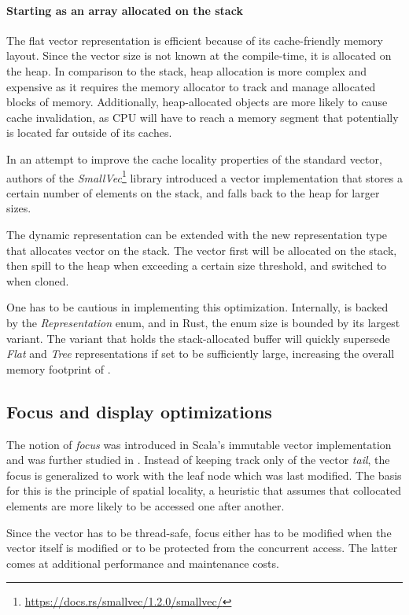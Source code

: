 \paragraph{Starting as an array allocated on the stack}
The flat vector representation is efficient because of its cache-friendly memory layout. Since the vector size is not known at the compile-time, it is allocated on the heap. In comparison to the stack, heap allocation is more complex and expensive as it requires the memory allocator to track and manage allocated blocks of memory. Additionally, heap-allocated objects are more likely to cause cache invalidation, as CPU will have to reach a memory segment that potentially is located far outside of its caches.

In an attempt to improve the cache locality properties of the standard vector, authors of the \emph{SmallVec}\footnote{\url{https://docs.rs/smallvec/1.2.0/smallvec/}} library introduced a vector implementation that stores a certain number of elements on the stack, and falls back to the heap for larger sizes.

The dynamic representation can be extended with the new representation type that allocates vector on the stack. The vector first will be allocated on the stack, then spill to the heap when exceeding a certain size threshold, and switched to \rrbvec{} when cloned.

One has to be cautious in implementing this optimization. Internally, \pvec{} is backed by the \emph{Representation} enum, and in Rust, the enum size is bounded by its largest variant. The variant that holds the stack-allocated buffer will quickly supersede \emph{Flat} and \emph{Tree} representations if set to be sufficiently large, increasing the overall memory footprint of \pvec{}.

\subsection{Focus and display optimizations}
The notion of \emph{focus} was introduced in Scala's immutable vector implementation and was further studied in \cite{rrb-vector-practical-general-purpose-im-sequence}. Instead of keeping track only of the vector \emph{tail}, the focus is generalized to work with the leaf node which was last modified. The basis for this is the principle of spatial locality, a heuristic that assumes that collocated elements are more likely to be accessed one after another.

Since the vector has to be thread-safe, focus either has to be modified when the vector itself is modified or to be protected from the concurrent access. The latter comes at additional performance and maintenance costs.

